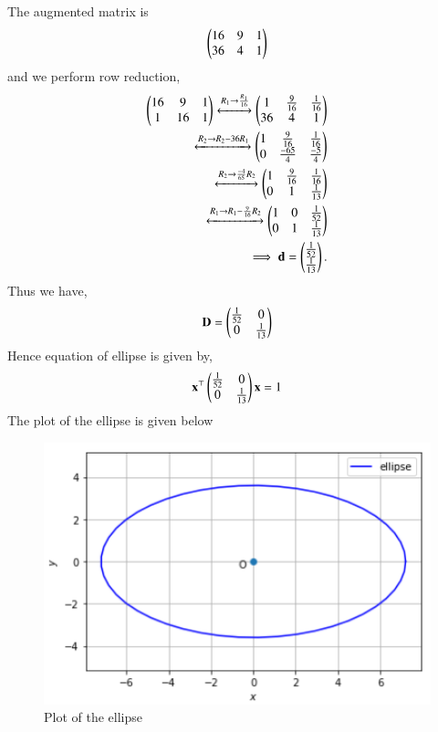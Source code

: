 \documentclass[journal,12pt,twocolumn]{IEEEtran}
\begin{document}
The augmented matrix is 
\begin{align}
\begin{pmatrix}16 & 9 & 1 \\ 36 & 4 & 1 \end{pmatrix}
\end{align}
and we perform row reduction,
\begin{align}
\begin{pmatrix}16 & 9 & 1\\ 1 & 16 & 1\end{pmatrix} 
\xleftrightarrow{R_1\rightarrow \frac{R_1}{16}}
\begin{pmatrix}1 & \frac{9}{16} & \frac{1}{16} \\ 36 & 4 & 1\end{pmatrix} 
\\
\xleftrightarrow{R_2\rightarrow R_2-36R_1}
\begin{pmatrix}1 & \frac{9}{16} & \frac{1}{16} \\ 0 & \frac{-65}{4} & \frac{-5}{4}\end{pmatrix} 
\\
\xleftrightarrow{R_2\rightarrow \frac{-4}{65}R_2}
\begin{pmatrix}1 & \frac{9}{16} & \frac{1}{16} \\ 0 & 1 & \frac{1}{13}\end{pmatrix}
\\
\xleftrightarrow{R_1\rightarrow R_1-\frac{9}{16}R_2}
\begin{pmatrix}1 & 0 & \frac{1}{52} \\ 0 & 1 & \frac{1}{13}\end{pmatrix}
\\
\implies \mathbf{d} = \begin{pmatrix}\frac{1}{52} \\ \frac{1}{13}\end{pmatrix}.
\end{align}
Thus we have,
\begin{align}
    \mathbf{D} = \begin{pmatrix}\frac{1}{52} & 0 \\ 0 & \frac{1}{13}\end{pmatrix}
\end{align}
Hence equation of ellipse is given by,
\begin{align}
\mathbf{x}^{\top}\begin{pmatrix}\frac{1}{52} & 0 \\ 0 & \frac{1}{13}\end{pmatrix}\mathbf{x} = 1
\end{align}
The plot of the ellipse is given below
\begin{figure}[ht]
\centering
\includegraphics[width=\columnwidth]{ellipse.PNG}
\caption{Plot of the ellipse}
\label{Plot of the ellipse}
\end{figure}
\end{document}
